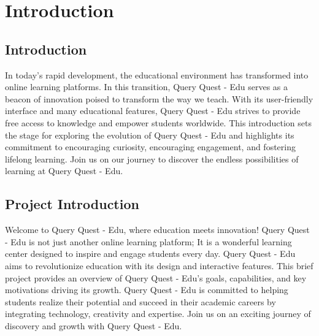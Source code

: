 \section{Introduction}

\subsection{Introduction}

In today's rapid development, the educational environment has transformed into online learning platforms. In this transition, Query Quest - Edu serves as a beacon of innovation poised to transform the way we teach. With its user-friendly interface and many educational features, Query Quest - Edu strives to provide free access to knowledge and empower students worldwide. This introduction sets the stage for exploring the evolution of Query Quest - Edu and highlights its commitment to encouraging curiosity, encouraging engagement, and fostering lifelong learning. Join us on our journey to discover the endless possibilities of learning at Query Quest - Edu.



\subsection{Project Introduction}
Welcome to Query Quest - Edu, where education meets innovation! Query Quest - Edu is not just another online learning platform; It is a wonderful learning center designed to inspire and engage students every day. Query Quest - Edu aims to revolutionize education with its design and interactive features. This brief project provides an overview of Query Quest - Edu's goals, capabilities, and key motivations driving its growth. Query Quest - Edu is committed to helping students realize their potential and succeed in their academic careers by integrating technology, creativity and expertise. Join us on an exciting journey of discovery and growth with Query Quest - Edu.

